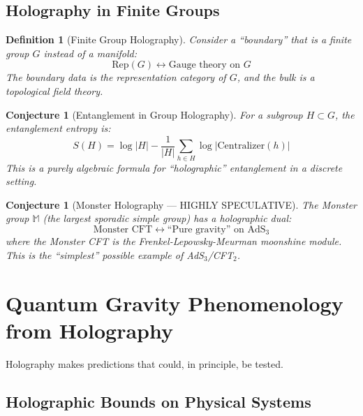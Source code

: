 \documentclass[12pt,a4paper]{article}
\newtheorem{conjecture}[theorem]{Conjecture}
\newtheorem{definition}[theorem]{Definition}
\begin{document}
\subsection{Holography in Finite Groups}

\begin{definition}[Finite Group Holography]
Consider a ``boundary'' that is a finite group $G$ instead of a manifold:
\begin{equation}
\text{Rep}(G) \longleftrightarrow \text{Gauge theory on } G
\end{equation}
The boundary data is the representation category of $G$, and the bulk is a topological field theory.
\end{definition}

\begin{conjecture}[Entanglement in Group Holography]
For a subgroup $H \subset G$, the entanglement entropy is:
\begin{equation}
S(H) = \log |H| - \frac{1}{|H|} \sum_{h \in H} \log |\text{Centralizer}(h)|
\end{equation}
This is a purely algebraic formula for ``holographic'' entanglement in a discrete setting.
\end{conjecture}

\begin{conjecture}[Monster Holography --- HIGHLY SPECULATIVE]
The Monster group $\mathbb{M}$ (the largest sporadic simple group) has a holographic dual:
\begin{equation}
\text{Monster CFT} \longleftrightarrow \text{``Pure gravity'' on } \text{AdS}_3
\end{equation}
where the Monster CFT is the Frenkel-Lepowsky-Meurman moonshine module. This is the ``simplest'' possible example of AdS$_3$/CFT$_2$.
\end{conjecture}

\section{Quantum Gravity Phenomenology from Holography}

Holography makes predictions that could, in principle, be tested.

\subsection{Holographic Bounds on Physical Systems}
\end{document}
